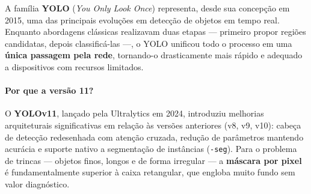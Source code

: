 \documentclass[11pt,a4paper]{article}
\begin{document}
A família \textbf{YOLO} (\emph{You Only Look Once}) representa, desde sua concepção em 2015,
uma das principais evoluções em detecção de objetos em tempo real. Enquanto abordagens clássicas
realizavam duas etapas — primeiro propor regiões candidatas, depois classificá-las —, o YOLO
unificou todo o processo em uma \textbf{única passagem pela rede}, tornando-o drasticamente mais
rápido e adequado a dispositivos com recursos limitados.

\paragraph{Por que a versão 11?}
O \textbf{YOLOv11}, lançado pela Ultralytics em 2024, introduziu melhorias arquiteturais
significativas em relação às versões anteriores (v8, v9, v10): cabeça de detecção
redesenhada com atenção cruzada, redução de parâmetros mantendo acurácia e suporte nativo a
segmentação de instâncias (\texttt{-seg}). Para o problema de trincas — objetos finos, longos
e de forma irregular — a \textbf{máscara por pixel} é fundamentalmente superior à caixa
retangular, que engloba muito fundo sem valor diagnóstico.
\end{document}
